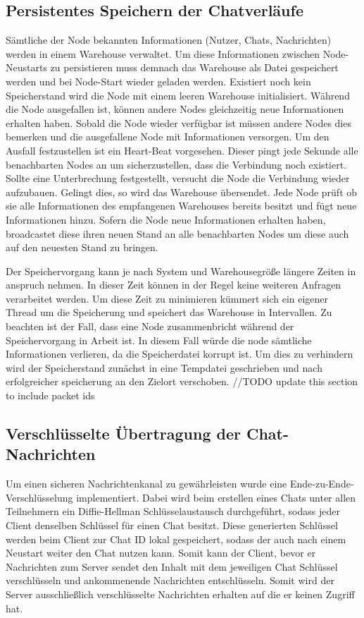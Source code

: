 \subsection{Persistentes Speichern der Chatverläufe}
Sämtliche der Node bekannten Informationen (Nutzer, Chats, Nachrichten) werden in einem Warehouse verwaltet. Um diese Informationen zwischen Node-Neustarts zu persistieren muss demnach das Warehouse als Datei gespeichert werden und bei Node-Start wieder geladen werden. Existiert noch kein Speicherstand wird die Node mit einem leeren Warehouse initialisiert. Während die Node ausgefallen ist, können andere Nodes gleichzeitig neue Informationen erhalten haben. Sobald die Node wieder verfügbar ist müssen andere Nodes dies bemerken und die ausgefallene Node mit Informationen versorgen. Um den Ausfall festzustellen ist ein Heart-Beat vorgesehen. Dieser pingt jede Sekunde alle benachbarten Nodes an um sicherzustellen, dass die Verbindung noch existiert. Sollte eine Unterbrechung festgestellt, versucht die Node die Verbindung wieder aufzubauen. Gelingt dies, so wird das Warehouse übersendet. Jede Node prüft ob sie alle Informationen des empfangenen Warehouses bereits besitzt und fügt neue Informationen hinzu. Sofern die Node neue Informationen erhalten haben, broadcastet diese ihren neuen Stand an alle benachbarten Nodes um diese auch auf den neuesten Stand zu bringen.

Der Speichervorgang kann je nach System und Warehousegröße längere Zeiten in anspruch nehmen. In dieser Zeit können in der Regel keine weiteren Anfragen verarbeitet werden. Um diese Zeit zu minimieren kümmert sich ein eigener Thread um die Speicherung und speichert das Warehouse in Intervallen.
Zu beachten ist der Fall, dass eine Node zusammenbricht während der Speichervorgang in Arbeit ist. In diesem Fall würde die node sämtliche Informationen verlieren, da die Speicherdatei korrupt ist. Um dies zu verhindern wird der Speicherstand zunächst in eine Tempdatei geschrieben und nach erfolgreicher speicherung an den Zielort verschoben.
//TODO update this section to include packet ids

\subsection{Verschlüsselte Übertragung der Chat-Nachrichten}
Um einen sicheren Nachrichtenkanal zu gewährleisten wurde eine 
Ende-zu-Ende-Verschlüsselung implementiert. Dabei wird beim
erstellen eines Chats unter allen Teilnehmern ein Diffie-Hellman 
Schlüsselaustausch durchgeführt, sodass jeder Client denselben 
Schlüssel für einen Chat besitzt. Diese generierten Schlüssel 
werden beim Client zur Chat ID lokal gespeichert, sodass der
auch nach einem Neustart weiter den Chat nutzen kann. Somit kann 
der Client, bevor er Nachrichten zum Server sendet den Inhalt mit dem 
jeweiligen Chat Schlüssel verschlüsseln und ankommenende 
Nachrichten entschlüsseln. Somit wird der Server ausschließlich
verschlüsselte Nachrichten erhalten auf die er keinen Zugriff hat.

